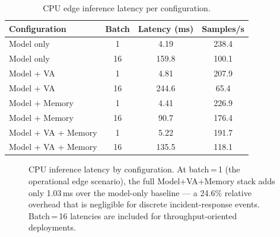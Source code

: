 \documentclass[runningheads]{llncs}
\begin{document}
\begin{table}[ht]
\centering
\caption{CPU edge inference latency per configuration.}
\label{tab:latency}
\begin{tabular}{lccc}
\toprule
Configuration & Batch & Latency (ms) & Samples/s \\
\midrule
Model only          & 1  &   4.19 & 238.4 \\
Model only          & 16 & 159.8  & 100.1 \\
Model + VA          & 1  &   4.81 & 207.9 \\
Model + VA          & 16 & 244.6  &  65.4 \\
Model + Memory      & 1  &   4.41 & 226.9 \\
Model + Memory      & 16 &  90.7  & 176.4 \\
Model + VA + Memory & 1  &   5.22 & 191.7 \\
Model + VA + Memory & 16 & 135.5  & 118.1 \\
\bottomrule
\end{tabular}
\end{table}

\begin{figure}[ht]
\centering
{}
\caption{CPU inference latency by configuration. At batch\,=\,1 (the operational edge scenario), the full Model+VA+Memory stack adds only 1.03\,ms over the model-only baseline — a 24.6\% relative overhead that is negligible for discrete incident-response events. Batch\,=\,16 latencies are included for throughput-oriented deployments.}
\label{fig:latency-bar}
\end{figure}
\end{document}
